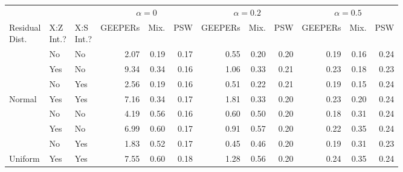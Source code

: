 
\begin{tabular}[t]{lllrrrrrrrrr}
\toprule
\multicolumn{3}{c}{ } & \multicolumn{3}{c}{$\alpha=0$} & \multicolumn{3}{c}{$\alpha=0.2$} & \multicolumn{3}{c}{$\alpha=0.5$} \\
\cmidrule(l{3pt}r{3pt}){4-6} \cmidrule(l{3pt}r{3pt}){7-9} \cmidrule(l{3pt}r{3pt}){10-12}
\makecell[l]{Residual\\Dist.} & \makecell[c]{X:Z\\Int.?} & \makecell[r]{X:S\\Int.?} & GEEPERs & Mix. & PSW & GEEPERs & Mix. & PSW & GEEPERs & Mix. & PSW\\
\midrule
 & No & No & 2.07 & 0.19 & 0.17 & 0.55 & 0.20 & 0.20 & 0.19 & 0.16 & 0.24\\

 & Yes & No & 9.34 & 0.34 & 0.16 & 1.06 & 0.33 & 0.21 & 0.23 & 0.18 & 0.23\\

 & No & Yes & 2.56 & 0.19 & 0.16 & 0.51 & 0.22 & 0.21 & 0.19 & 0.15 & 0.24\\

\multirow{-4}{*}{\raggedright\arraybackslash Normal} & Yes & Yes & 7.16 & 0.34 & 0.17 & 1.81 & 0.33 & 0.20 & 0.23 & 0.20 & 0.24\\
\cmidrule{1-12}
 & No & No & 4.19 & 0.56 & 0.16 & 0.60 & 0.50 & 0.20 & 0.18 & 0.31 & 0.24\\

 & Yes & No & 6.99 & 0.60 & 0.17 & 0.91 & 0.57 & 0.20 & 0.22 & 0.35 & 0.24\\

 & No & Yes & 1.83 & 0.52 & 0.17 & 0.45 & 0.46 & 0.20 & 0.19 & 0.31 & 0.23\\

\multirow{-4}{*}{\raggedright\arraybackslash Uniform} & Yes & Yes & 7.55 & 0.60 & 0.18 & 1.28 & 0.56 & 0.20 & 0.24 & 0.35 & 0.24\\
\bottomrule
\end{tabular}
